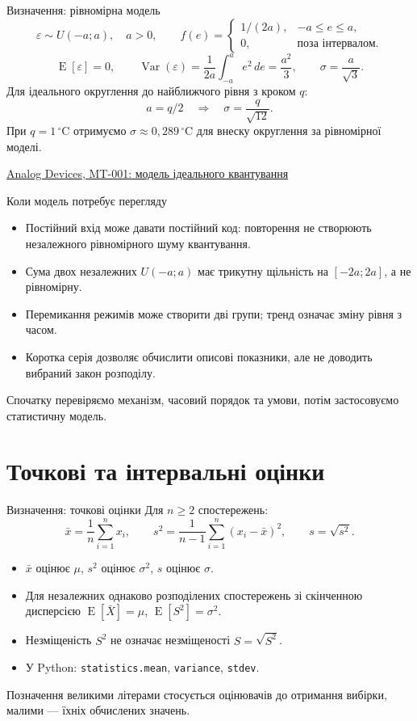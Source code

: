 \documentclass[aspectratio=169,11pt]{beamer}
\newcommand{\src}[2]{\par\vfill{\tiny\href{#1}{#2}}}
\newcommand{\E}{\operatorname{E}}
\newcommand{\Var}{\operatorname{Var}}
\begin{document}
\begin{frame}{Визначення: рівномірна модель}
\[
\varepsilon\sim U(-a;a),\quad a>0,\qquad
f(e)=\begin{cases}1/(2a),&-a\le e\le a,\\0,&\text{поза інтервалом}.\end{cases}
\]
\[
\E[\varepsilon]=0,\qquad
\Var(\varepsilon)=\frac1{2a}\int_{-a}^{a}e^2\,de
=\frac{a^2}{3},\qquad \sigma=\frac{a}{\sqrt3}.
\]
Для ідеального округлення до найближчого рівня з кроком $q$:
\[
a=q/2\quad\Longrightarrow\quad \sigma=\frac q{\sqrt{12}}.
\]
При $q=1\,{}^\circ\mathrm C$ отримуємо $\sigma\approx0{,}289\,{}^\circ\mathrm C$ для внеску округлення за рівномірної моделі.
\src{https://www.analog.com/media/en/training-seminars/tutorials/MT-001.pdf}{Analog Devices, MT-001: модель ідеального квантування}
\end{frame}

\begin{frame}{Коли модель потребує перегляду}
\begin{itemize}
\item Постійний вхід може давати постійний код: повторення не створюють незалежного рівномірного шуму квантування.
\item Сума двох незалежних $U(-a;a)$ має трикутну щільність на $[-2a;2a]$, а не рівномірну.
\item Перемикання режимів може створити дві групи; тренд означає зміну рівня з часом.
\item Коротка серія дозволяє обчислити описові показники, але не доводить вибраний закон розподілу.
\end{itemize}
Спочатку перевіряємо механізм, часовий порядок та умови, потім застосовуємо статистичну модель.
\end{frame}

\section{Точкові та інтервальні оцінки}
\begin{frame}{Визначення: точкові оцінки}
Для $n\ge2$ спостережень:
\[
\bar x=\frac1n\sum_{i=1}^n x_i,\qquad
s^2=\frac1{n-1}\sum_{i=1}^n(x_i-\bar x)^2,\qquad s=\sqrt{s^2}.
\]
\begin{itemize}
\item $\bar x$ оцінює $\mu$, $s^2$ оцінює $\sigma^2$, $s$ оцінює $\sigma$.
\item Для незалежних однаково розподілених спостережень зі скінченною дисперсією $\E[\bar X]=\mu$, $\E[S^2]=\sigma^2$.
\item Незміщеність $S^2$ не означає незміщеності $S=\sqrt{S^2}$.
\item У Python: \texttt{statistics.mean}, \texttt{variance}, \texttt{stdev}.
\end{itemize}
Позначення великими літерами стосується оцінювачів до отримання вибірки, малими — їхніх обчислених значень.
\end{frame}
\end{document}
